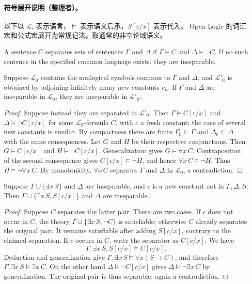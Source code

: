 
\paragraph{符号展开说明（整理者）。}
以下以 $\mathcal L_i$ 表示语言，$\models$ 表示语义后承，$S[c/x]$ 表示代入。
Open Logic 的词汇宏和公式宏展开为常规记法。取通常的非空论域语义。

\begin{definition}[Separation]
A sentence $C$ separates sets of sentences $\Gamma$ and $\Delta$ if
$\Gamma\models C$ and $\Delta\models\neg C$. If no such sentence
in the specified common language exists, they are inseparable.
\end{definition}
\begin{lemma}
Suppose $\mathcal L_0$ contains the nonlogical symbols common to $\Gamma$
and $\Delta$, and $\mathcal L'_0$ is obtained by adjoining infinitely many
new constants $c_n$. If $\Gamma$ and $\Delta$ are inseparable in
$\mathcal L_0$, they are inseparable in $\mathcal L'_0$.
\end{lemma}
\begin{proof}
Suppose instead they are separated in $\mathcal L'_0$.
Then $\Gamma\models C[c/x]$ and $\Delta\models\neg C[c/x]$ for some
$\mathcal L_0$-formula $C$, with $c$ a fresh constant; the case of several
new constants is similar. By compactness there are finite
$\Gamma_0\subseteq\Gamma$ and $\Delta_0\subseteq\Delta$ with the same
consequences. Let $G$ and $H$ be their respective conjunctions. Then
$G\models C[c/x]$ and $H\models\neg C[c/x]$.
Generalization gives $G\models\forall x\,C$. Contraposition of the second
consequence gives $C[c/x]\models\neg H$, and hence
$\forall x\,C\models\neg H$. Thus $H\models\neg\forall x\,C$.
By monotonicity, $\forall x\,C$ separates $\Gamma$ and $\Delta$
in $\mathcal L_0$, a contradiction.
\end{proof}
\begin{lemma}
Suppose $\Gamma\cup\{\exists x\,S\}$ and $\Delta$ are inseparable, and
$c$ is a new constant not in $\Gamma,\Delta,S$.
Then $\Gamma\cup\{\exists x\,S,S[c/x]\}$ and $\Delta$ are inseparable.
\end{lemma}
\begin{proof}
Suppose $C$ separates the latter pair. There are two cases.
If $c$ does not occur in $C$, the theory
$\Gamma\cup\{\exists x\,S,\neg C\}$ is satisfiable; otherwise $C$
already separates the original pair. It remains satisfiable after
adding $S[c/x]$, contrary to the claimed separation.
If $c$ occurs in $C$, write the separator as $C[c/x]$. We have
\[
\Gamma,\exists x\,S,S[c/x]\models C[c/x].
\]
Deduction and generalization give
$\Gamma,\exists x\,S\models\forall x(S\to C)$, and therefore
$\Gamma,\exists x\,S\models\exists x\,C$.
On the other hand $\Delta\models\neg C[c/x]$ gives
$\Delta\models\neg\exists x\,C$ by generalization.
The original pair is thus separable, again a contradiction.
\end{proof}

